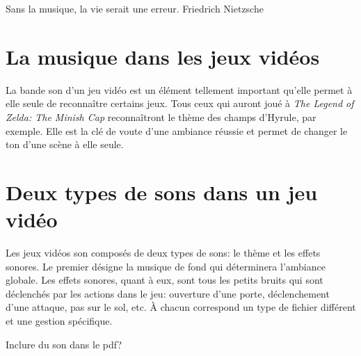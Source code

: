\printMiniToc

Sans la musique, la vie serait une erreur.
Friedrich Nietzsche

\section{La musique dans les jeux vidéos}
La bande son d'un jeu vidéo est un élément tellement important qu'elle permet à elle seule de reconnaître certains jeux. Tous ceux qui auront joué à \textit{The Legend of Zelda: The Minish Cap} reconnaîtront le thème des champs d'Hyrule, par exemple. Elle est la clé de voute d'une ambiance réussie et permet de changer le ton d'une scène à elle seule.

\section{Deux types de sons dans un jeu vidéo}
Les jeux vidéos son composés de deux types de sons: le thème et les effets sonores. Le premier désigne la musique de fond qui déterminera l'ambiance globale. Les effets sonores, quant à eux, sont tous les petits bruits qui sont déclenchés par les actions dans le jeu: ouverture d'une porte, déclenchement d'une attaque, pas sur le sol, etc. À chacun correspond un type de fichier différent et une gestion spécifique.

Inclure du son dans le pdf?